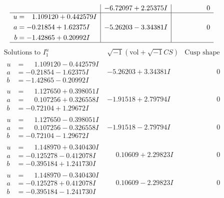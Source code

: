 \documentclass[1p]{elsarticle_modified}
\theoremstyle{definition}
\newcommand{\I}{\sqrt{-1}}
\begin{document}
$$\begin{array}{c|c|c}
 & -6.72097 + 2.25375 I & \phantom{-0.000000 } 0 \\ \hline\begin{aligned}
u &= \phantom{-}1.109120 + 0.442579 I \\
a &= -0.21854 + 1.62375 I \\
b &= -1.42865 + 0.20992 I\end{aligned}
 & -5.26203 - 3.34381 I & \phantom{-0.000000 } 0\\
 \hline 
 \end{array}$$\newpage$$\begin{array}{c|c|c}  
\text{Solutions to }I^u_{1}& \I (\text{vol} + \sqrt{-1}CS) & \text{Cusp shape}\\
 \hline 
\begin{aligned}
u &= \phantom{-}1.109120 - 0.442579 I \\
a &= -0.21854 - 1.62375 I \\
b &= -1.42865 - 0.20992 I\end{aligned}
 & -5.26203 + 3.34381 I & \phantom{-0.000000 } 0 \\ \hline\begin{aligned}
u &= \phantom{-}1.127650 + 0.398051 I \\
a &= \phantom{-}0.107256 + 0.326558 I \\
b &= -0.72104 + 1.29672 I\end{aligned}
 & -1.91518 + 2.79794 I & \phantom{-0.000000 } 0 \\ \hline\begin{aligned}
u &= \phantom{-}1.127650 - 0.398051 I \\
a &= \phantom{-}0.107256 - 0.326558 I \\
b &= -0.72104 - 1.29672 I\end{aligned}
 & -1.91518 - 2.79794 I & \phantom{-0.000000 } 0 \\ \hline\begin{aligned}
u &= \phantom{-}1.148970 + 0.340430 I \\
a &= -0.125278 - 0.412078 I \\
b &= -0.395184 + 1.241730 I\end{aligned}
 & \phantom{-}0.10609 + 2.29823 I & \phantom{-0.000000 } 0 \\ \hline\begin{aligned}
u &= \phantom{-}1.148970 - 0.340430 I \\
a &= -0.125278 + 0.412078 I \\
b &= -0.395184 - 1.241730 I\end{aligned}
 & \phantom{-}0.10609 - 2.29823 I & \phantom{-0.000000 } 0 \\ \hline\begin{aligned}

\end{aligned}
\end{array}$$
\end{document}

